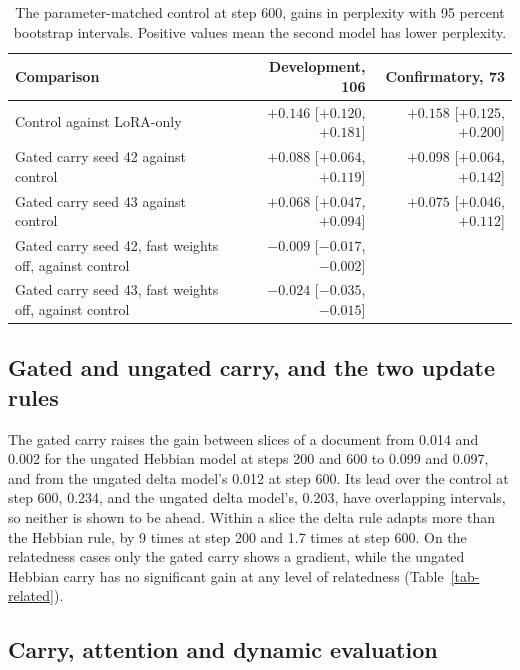 \documentclass[12pt,a4paper]{report}
\begin{document}
\begin{table}[H]
  \centering
  \caption{The parameter-matched control at step 600, gains in perplexity with 95 percent bootstrap intervals. Positive values mean the second model has lower perplexity.}
  \label{tab-pmatched}
  \small
  \begin{tabular}{lrr}
    \toprule
    Comparison & Development, 106 & Confirmatory, 73 \\
    \midrule
    Control against LoRA-only & $+0.146$ {\footnotesize [$+0.120$, $+0.181$]} & $+0.158$ {\footnotesize [$+0.125$, $+0.200$]} \\
    Gated carry seed 42 against control & $+0.088$ {\footnotesize [$+0.064$, $+0.119$]} & $+0.098$ {\footnotesize [$+0.064$, $+0.142$]} \\
    Gated carry seed 43 against control & $+0.068$ {\footnotesize [$+0.047$, $+0.094$]} & $+0.075$ {\footnotesize [$+0.046$, $+0.112$]} \\
    Gated carry seed 42, fast weights off, against control & $-0.009$ {\footnotesize [$-0.017$, $-0.002$]} & \\
    Gated carry seed 43, fast weights off, against control & $-0.024$ {\footnotesize [$-0.035$, $-0.015$]} & \\
    \bottomrule
  \end{tabular}
\end{table}

\subsection{Gated and ungated carry, and the two update rules}

The gated carry raises the gain between slices of a document from 0.014 and 0.002 for the ungated Hebbian model at steps 200 and 600 to 0.099 and 0.097, and from the ungated delta model's 0.012 at step 600. Its lead over the control at step 600, 0.234, and the ungated delta model's, 0.203, have overlapping intervals, so neither is shown to be ahead. Within a slice the delta rule adapts more than the Hebbian rule, by 9 times at step 200 and 1.7 times at step 600. On the relatedness cases only the gated carry shows a gradient, while the ungated Hebbian carry has no significant gain at any level of relatedness (Table~\ref{tab-related}).

\subsection{Carry, attention and dynamic evaluation}
\end{document}
